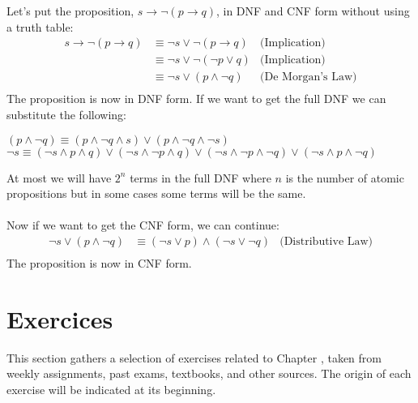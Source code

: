 \begin{eg}
    Let's put the proposition, $s \to \neg (p \to q)$, in DNF and CNF form without using a truth table:
    \begin{align*}
        s \to \neg (p \to q) &\equiv \neg s \lor \neg (p \to q) &\text{(Implication)} \\
        &\equiv \neg s \lor \neg (\neg p \lor q) &\text{(Implication)} \\
        &\equiv \neg s \lor (p \land \neg q) &\text{(De Morgan's Law)} \\
    \end{align*}
    The proposition is now in DNF form. If we want to get the full DNF we can substitute the following:
    \begin{center}
        $(p \land \neg q) \equiv (p \land \neg q \land s) \lor (p \land \neg q \land \neg s)$ \\
        $\neg s \equiv (\neg s \land p \land q) \lor (\neg s \land \neg p \land q) \lor (\neg s \land \neg p \land \neg q) \lor (\neg s \land p \land \neg q)$
    \end{center}
    At most we will have $2^n$ terms in the full DNF where $n$ is the number of atomic propositions but in some cases some terms will be the same.\\ \\
    Now if we want to get the CNF form, we can continue:
    \begin{align*}
        \neg s \lor (p \land \neg q) &\equiv (\neg s \lor p) \land (\neg s \lor \neg q) &\text{(Distributive Law)} \\
    \end{align*}
    The proposition is now in CNF form.
\end{eg}

\section{Exercices}
This section gathers a selection of exercises related to Chapter \thechapter, taken from weekly assignments, past exams, textbooks, and other sources. The origin of each exercise will be indicated at its beginning.